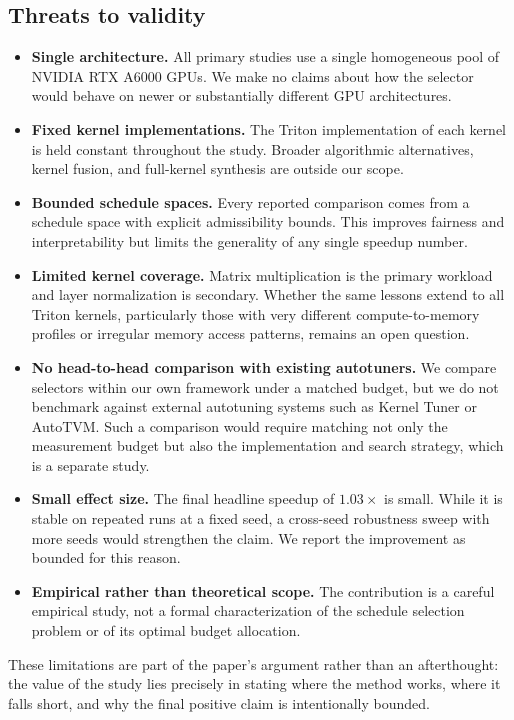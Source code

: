 \subsection{Threats to validity}

\begin{itemize}
\item \textbf{Single architecture.} All primary studies use a single homogeneous pool of NVIDIA RTX A6000 GPUs. We make no claims about how the selector would behave on newer or substantially different GPU architectures.
\item \textbf{Fixed kernel implementations.} The Triton implementation of each kernel is held constant throughout the study. Broader algorithmic alternatives, kernel fusion, and full-kernel synthesis are outside our scope.
\item \textbf{Bounded schedule spaces.} Every reported comparison comes from a schedule space with explicit admissibility bounds. This improves fairness and interpretability but limits the generality of any single speedup number.
\item \textbf{Limited kernel coverage.} Matrix multiplication is the primary workload and layer normalization is secondary. Whether the same lessons extend to all Triton kernels, particularly those with very different compute-to-memory profiles or irregular memory access patterns, remains an open question.
\item \textbf{No head-to-head comparison with existing autotuners.} We compare selectors within our own framework under a matched budget, but we do not benchmark against external autotuning systems such as Kernel Tuner or AutoTVM. Such a comparison would require matching not only the measurement budget but also the implementation and search strategy, which is a separate study.
\item \textbf{Small effect size.} The final headline speedup of $1.03\times$ is small. While it is stable on repeated runs at a fixed seed, a cross-seed robustness sweep with more seeds would strengthen the claim. We report the improvement as bounded for this reason.
\item \textbf{Empirical rather than theoretical scope.} The contribution is a careful empirical study, not a formal characterization of the schedule selection problem or of its optimal budget allocation.
\end{itemize}

These limitations are part of the paper's argument rather than an afterthought: the value of the study lies precisely in stating where the method works, where it falls short, and why the final positive claim is intentionally bounded.
